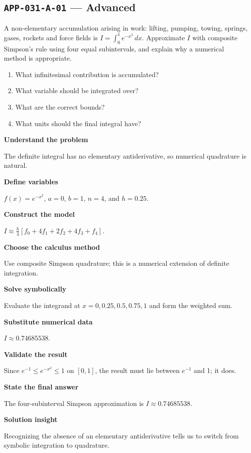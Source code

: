 \documentclass[11pt]{book}
\newcommand{\pid}[1]{\texttt{#1}}
\begin{document}
\subsection*{\pid{APP-031-A-01} — Advanced}
\begin{problembox}
A non-elementary accumulation arising in work: lifting, pumping, towing, springs, gases, rockets and force fields is $I=\int_0^1 e^{-x^2}\,dx$. Approximate $I$ with composite Simpson's rule using four equal subintervals, and explain why a numerical method is appropriate.
\end{problembox}
\begin{promptbox}\begin{enumerate}
\item What infinitesimal contribution is accumulated?
\item What variable should be integrated over?
\item What are the correct bounds?
\item What units should the final integral have?
\end{enumerate}\end{promptbox}
\begin{solutionbox}
\textbf{Understand the problem}\par The definite integral has no elementary antiderivative, so numerical quadrature is natural.\par\medskip
\textbf{Define variables}\par $f(x)=e^{-x^2}$, $a=0$, $b=1$, $n=4$, and $h=0.25$.\par\medskip
\textbf{Construct the model}\par $I\approx\frac{h}{3}[f_0+4f_1+2f_2+4f_3+f_4]$.\par\medskip
\textbf{Choose the calculus method}\par Use composite Simpson quadrature; this is a numerical extension of definite integration.\par\medskip
\textbf{Solve symbolically}\par Evaluate the integrand at $x=0,0.25,0.5,0.75,1$ and form the weighted sum.\par\medskip
\textbf{Substitute numerical data}\par $I\approx 0.74685538$.\par\medskip
\textbf{Validate the result}\par Since $e^{-1}\le e^{-x^2}\le1$ on $[0,1]$, the result must lie between $e^{-1}$ and 1; it does.\par\medskip
\textbf{State the final answer}\par The four-subinterval Simpson approximation is $I\approx 0.74685538$.\par\medskip
\textbf{Solution insight}\par Recognizing the absence of an elementary antiderivative tells us to switch from symbolic integration to quadrature.\par\medskip
\end{solutionbox}
\end{document}
